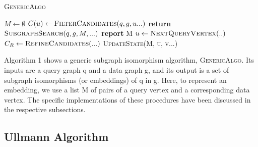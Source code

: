 \documentclass[
10pt, %
a4paper, %
oneside, %
headinclude,footinclude, %
BCOR5mm, %
]{scrartcl}
\begin{document}
\begin{algorithm}
\caption{\textsc{GenericAlgo}}\label{euclid}
\begin{algorithmic}[1]
\State $M \gets \emptyset$
\State $C(u) \gets \textsc{FilterCandidates}(q, g, u...)$
\State \textbf{return}
\EndIf
\EndFor
\State $\textsc{SubgraphSearch}(q, g, M,...)$ 
    \State \textbf{report} M
    \Else
    \State $u \gets \textsc{NextQueryVertex}(..)$
    \State $C_R \gets \textsc{RefineCandidates}(...)$
            \State \textsc{UpdateState(M, u, v...)}
        \EndIf
    \EndFor
\EndIf
\EndProcedure
\end{algorithmic}
\end{algorithm}

Algorithm 1 shows a generic subgraph isomorphism algorithm, \textsc{GenericAlgo}. Its inputs are a query graph q and a data graph g, and its output is a set of subgraph isomorphisms (or embeddings) of q in g. Here, to represent an embedding, we use a list M of pairs of a query vertex and a corresponding data vertex. The specific implementations of these procedures have been discussed in the respective subsections.


\subsection{Ullmann Algorithm\cite{ullmann}}
\end{document}
